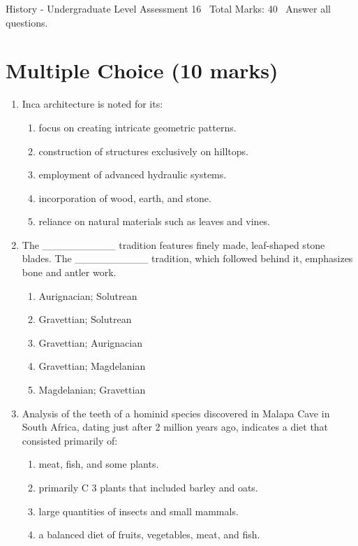 \documentclass[12pt]{article}
\begin{document}
\begin{center}
History - Undergraduate Level Assessment 16 \
Total Marks: 40 \
Answer all questions.
\end{center}

\section*{Multiple Choice (10 marks)}
\begin{enumerate}[label=\arabic*.]
\item Inca architecture is noted for its:
\begin{enumerate}[label=(\alph*)]
    \item focus on creating intricate geometric patterns.
    \item construction of structures exclusively on hilltops.
    \item employment of advanced hydraulic systems.
    \item incorporation of wood, earth, and stone.
    \item reliance on natural materials such as leaves and vines.
\end{enumerate}
\item The \_\_\_\_\_\_\_\_\_\_ tradition features finely made, leaf-shaped stone blades. The \_\_\_\_\_\_\_\_\_\_ tradition, which followed behind it, emphasizes bone and antler work.
\begin{enumerate}[label=(\alph*)]
    \item Aurignacian; Solutrean
    \item Gravettian; Solutrean
    \item Gravettian; Aurignacian
    \item Gravettian; Magdelanian
    \item Magdelanian; Gravettian
\end{enumerate}
\item Analysis of the teeth of a hominid species discovered in Malapa Cave in South Africa, dating just after 2 million years ago, indicates a diet that consisted primarily of:
\begin{enumerate}[label=(\alph*)]
    \item meat, fish, and some plants.
    \item primarily C 3 plants that included barley and oats.
    \item large quantities of insects and small mammals.
    \item a balanced diet of fruits, vegetables, meat, and fish.

\end{enumerate}
\end{enumerate}
\end{document}
